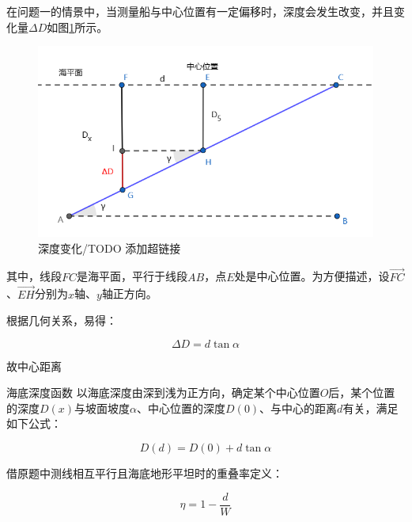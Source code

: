 在问题一的情景中，当测量船与中心位置有一定偏移时，深度会发生改变，并且变化量$\Delta D$如图\ref{fig:深度变化}所示。



\begin{figure}[h]
    \centering
    \includegraphics[scale=0.5]{res/img/深度变化.png}
    \caption{深度变化/TODO 添加超链接}
    \label{fig:深度变化}
\end{figure}

其中，线段$FC$是海平面，平行于线段$AB$，点$E$处是中心位置。为方便描述，设$\overrightarrow{FC}$、$\overrightarrow{EH}$分别为$x$轴、$y$轴正方向。

根据几何关系，易得：

\begin{equation}
    \Delta D = d\tan\alpha
\end{equation}

故中心距离\newline\newline\newline\newline

\begin{mcmTheorem}{海底深度函数}
    以海底深度由深到浅为正方向，确定某个中心位置$O$后，某个位置的深度$D(x)$与坡面坡度$\alpha$、中心位置的深度$D(0)$、与中心的距离$d$有关，满足如下公式：

    \begin{equation}
        D(d) = D(0) + d\tan\alpha
    \end{equation}
\end{mcmTheorem}

借原题中测线相互平行且海底地形平坦时的重叠率定义：

\begin{equation}
    \eta = 1 - \frac{d}{W}
\end{equation}

